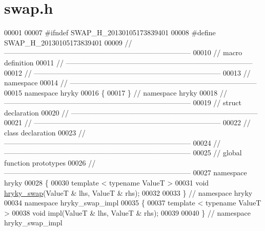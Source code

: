 \hypertarget{swap_8h_source}{\section{swap.\-h}
}

\begin{DoxyCode}
00001 
00007 \textcolor{preprocessor}{#ifndef SWAP\_H\_20130105173839401}
00008 \textcolor{preprocessor}{}\textcolor{preprocessor}{#define SWAP\_H\_20130105173839401}
00009 \textcolor{preprocessor}{}\textcolor{comment}{//
      ------------------------------------------------------------------------------}
00010 \textcolor{comment}{// macro definition}
00011 \textcolor{comment}{//
      ------------------------------------------------------------------------------}
00012 \textcolor{comment}{//
      ------------------------------------------------------------------------------}
00013 \textcolor{comment}{// namespace}
00014 \textcolor{comment}{//
      ------------------------------------------------------------------------------}
00015 \textcolor{keyword}{namespace }hryky
00016 \{
00017 \} \textcolor{comment}{// namespace hryky}
00018 \textcolor{comment}{//
      ------------------------------------------------------------------------------}
00019 \textcolor{comment}{// struct declaration}
00020 \textcolor{comment}{//
      ------------------------------------------------------------------------------}
00021 \textcolor{comment}{//
      ------------------------------------------------------------------------------}
00022 \textcolor{comment}{// class declaration}
00023 \textcolor{comment}{//
      ------------------------------------------------------------------------------}
00024 \textcolor{comment}{//
      ------------------------------------------------------------------------------}
00025 \textcolor{comment}{// global function prototypes}
00026 \textcolor{comment}{//
      ------------------------------------------------------------------------------}
00027 \textcolor{keyword}{namespace }hryky
00028 \{
00030     \textcolor{keyword}{template} < \textcolor{keyword}{typename} ValueT >
00031     \textcolor{keywordtype}{void} \hyperlink{namespacehryky_add9c1c1fdfda07cd47bcb7c16d3a823a}{hryky_swap}(ValueT & lhs, ValueT & rhs);
00032 
00033 \} \textcolor{comment}{// namespace hryky}
00034 \textcolor{keyword}{namespace }hryky\_swap\_impl
00035 \{
00037     \textcolor{keyword}{template} < \textcolor{keyword}{typename} ValueT >
00038     \textcolor{keywordtype}{void} impl(ValueT & lhs, ValueT & rhs);
00039 
00040 \} \textcolor{comment}{// namespace hryky\_swap\_impl}

\end{DoxyCode}
